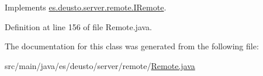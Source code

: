 Implements \hyperlink{interfacees_1_1deusto_1_1server_1_1remote_1_1_i_remote_aaaf6af5906c81cbd7b3b190a70ead98b}{es.\+deusto.\+server.\+remote.\+I\+Remote}.



Definition at line 156 of file Remote.\+java.



The documentation for this class was generated from the following file\+:\begin{DoxyCompactItemize}
\item 
src/main/java/es/deusto/server/remote/\hyperlink{_remote_8java}{Remote.\+java}\end{DoxyCompactItemize}
